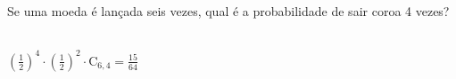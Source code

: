 \begin{ex}
Se uma moeda é lançada seis vezes, qual é a probabilidade de sair coroa 4 vezes?
  \begin{sol}
  \phantom{A} \\
  $(\frac{1}{2})^4\cdot(\frac{1}{2})^2\cdot\mathrm{C}_{6,4}=\frac{15}{64}$
  \end{sol}
\end{ex}